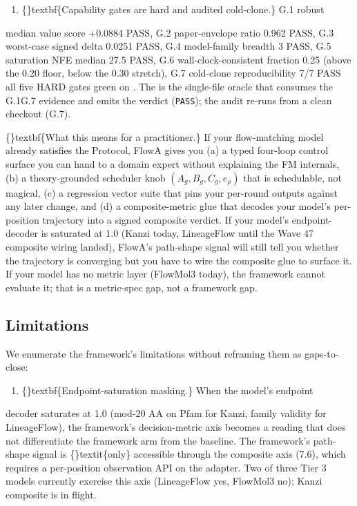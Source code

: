 \documentclass{article}
\begin{document}
\begin{enumerate}
\item \{\}textbf\{Capability gates are hard and audited cold-clone.\} G.1 robust
\end{enumerate}
median value score +0.0884 PASS, G.2 paper-envelope ratio 0.962 PASS, G.3 worst-case signed delta 0.0251 PASS, G.4 model-family breadth 3 PASS, G.5 saturation NFE median 27.5 PASS, G.6 wall-clock-consistent fraction 0.25 (above the 0.20 floor, below the 0.30 stretch), G.7 cold-clone reproducibility 7/7 PASS  all five HARD gates green on . The  is the single-file oracle that consumes the G.1G.7 evidence and emits the  verdict (\texttt{PASS}); the audit re-runs from a clean checkout (G.7).

\{\}textbf\{What this means for a practitioner.\} If your flow-matching model already satisfies the Protocol, FlowA gives you (a) a typed four-loop control surface you can hand to a domain expert without explaining the FM internals, (b) a theory-grounded scheduler knob $(A_g, B_g, C_g, e_\rho)$ that is schedulable, not magical, (c) a regression vector suite that pins your per-round outputs against any later change, and (d) a composite-metric glue that decodes your model's per-position trajectory into a signed composite verdict. If your model's endpoint-decoder is saturated at 1.0 (Kanzi today, LineageFlow until the Wave 47 composite wiring landed), FlowA's path-shape signal will still tell you whether the trajectory is converging  but you have to wire the composite glue to surface it. If your model has no metric layer (FlowMol3 today), the framework cannot evaluate it; that is a metric-spec gap, not a framework gap.

\subsection{Limitations}
We enumerate the framework's limitations without reframing them as gaps-to-close:

\begin{enumerate}
\item \{\}textbf\{Endpoint-saturation masking.\} When the model's endpoint
\end{enumerate}
decoder saturates at 1.0 (mod-20 AA on Pfam for Kanzi, family validity for LineageFlow), the framework's decision-metric axis becomes a  reading that does not differentiate the framework arm from the baseline. The framework's path-shape signal is \{\}textit\{only\} accessible through the composite axis (7.6), which requires a per-position observation API on the adapter. Two of three Tier 3 models currently exercise this axis (LineageFlow yes, FlowMol3 no); Kanzi composite is in flight.
\end{document}
